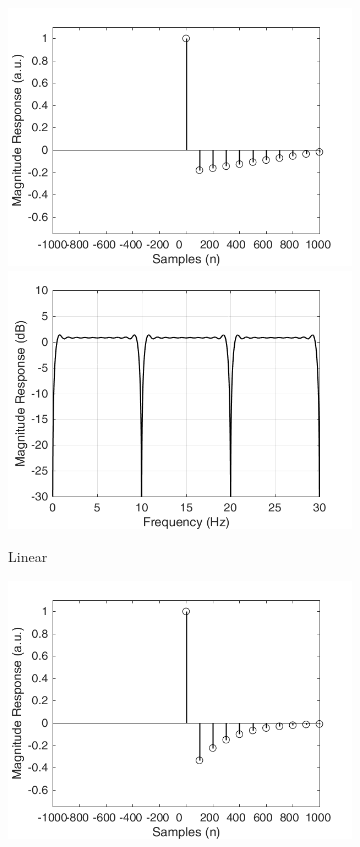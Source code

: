 \documentclass[a4paper]{article}
\begin{document}
\begin{figure}[hbtp]
\begin{subfigure}{.245\textwidth}
        \includegraphics[width=\textwidth]{img/causal/kernel_linear.png}\\
        \includegraphics[width=\textwidth]{img/causal/mag_linear.png}
        \caption{Linear}\label{fig:LinearKernel}
    \end{subfigure}
    \begin{subfigure}{.245\textwidth}
        \includegraphics[width=\textwidth]{img/causal/kernel_exp.png}\\

\end{subfigure}
\end{figure}
\end{document}
